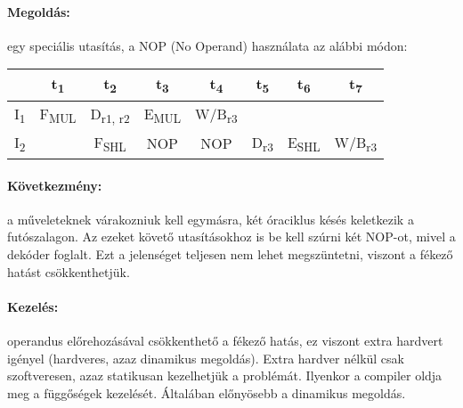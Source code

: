 \paragraph{Megoldás:}egy speciális utasítás, a NOP (No Operand) használata az alábbi módon:
\begin{center}
    \begin{tabular}{ c | c | c | c | c | c | c | c}
                           & t\textsubscript{1}   & t\textsubscript{2}      & t\textsubscript{3}   & t\textsubscript{4}    & t\textsubscript{5}  & t\textsubscript{6}   & t\textsubscript{7}    \\
        \hline
        I\textsubscript{1} & F\textsubscript{MUL} & D\textsubscript{r1, r2} & E\textsubscript{MUL} & W/B\textsubscript{r3} &                     &                                              \\
        \hline
        I\textsubscript{2} &                      & F\textsubscript{SHL}    & NOP                  & NOP                   & D\textsubscript{r3} & E\textsubscript{SHL} & W/B\textsubscript{r3}
    \end{tabular}
\end{center}
\paragraph{Következmény:} a műveleteknek várakozniuk kell egymásra, két óraciklus késés keletkezik a futószalagon. Az ezeket követő utasításokhoz is be kell szúrni két NOP-ot, mivel a dekóder foglalt.
Ezt a jelenséget teljesen nem lehet megszüntetni, viszont a fékező hatást csökkenthetjük.
\paragraph{Kezelés:}operandus előrehozásával csökkenthető a fékező hatás, ez viszont extra hardvert igényel (hardveres, azaz dinamikus megoldás).
Extra hardver nélkül csak szoftveresen, azaz statikusan kezelhetjük a problémát.
Ilyenkor a compiler oldja meg a függőségek kezelését.
Általában előnyösebb a dinamikus megoldás.
